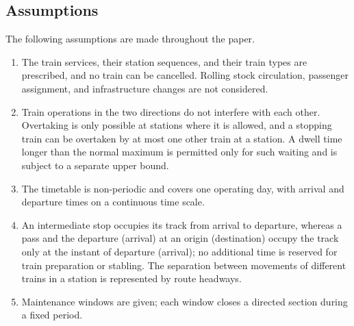 \subsection{Assumptions}
The following assumptions are made throughout the paper.
\begin{enumerate}[label=(A\arabic*)]
\item The train services, their station sequences, and their train types are prescribed, and no train can be cancelled. Rolling stock circulation, passenger assignment, and infrastructure changes are not considered.
\item Train operations in the two directions do not interfere with each other. Overtaking is only possible at stations where it is allowed, and a stopping train can be overtaken by at most one other train at a station. A dwell time longer than the normal maximum is permitted only for such waiting and is subject to a separate upper bound.
\item The timetable is non-periodic and covers one operating day, with arrival and departure times on a continuous time scale.
\item An intermediate stop occupies its track from arrival to departure, whereas a pass and the departure (arrival) at an origin (destination) occupy the track only at the instant of departure (arrival); no additional time is reserved for train preparation or stabling. The separation between movements of different trains in a station is represented by route headways.
\item Maintenance windows are given; each window closes a directed section during a fixed period.
\end{enumerate}
